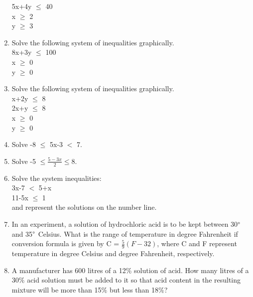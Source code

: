 \begin{enumerate}[label=\arabic*.,ref=\thesubsection.\theenumi]
     5x+4y $\leq$ 40\\
     x $\geq$ 2\\
     y $\geq$ 3\\
     \item Solve the following system of inequalities graphically.\\
     8x+3y $\leq$ 100\\
     x $\geq$ 0\\
     y $\geq$ 0\\
     \item Solve the following system of inequalities graphically.\\
     x+2y $\leq$ 8\\
     2x+y $\leq$ 8\\
     x $\geq$ 0\\
     y $\geq$ 0\\
     \item Solve -8 $\leq$ 5x-3 $<$ 7.\\
     \item Solve -5 $\leq \frac{5-3x}{2} \leq 8$.\\
     \item Solve the system inequalities:\\
     3x-7 $<$ 5+x\\
     11-5x $\leq$ 1\\
     and represent the solutions on the number line.\\
     \item In an experiment, a solution of hydrochloric acid is to be kept between 30$\degree$ and 35$\degree$ Celsius. What is the range of temperature in degree Fahrenheit if conversion formula is given by 
     C = $\frac{5}{9}(F-32)$, where C and F represent temperature in degree Celsius and degree Fahrenheit, respectively.\\
     \item A manufacturer has 600 litres of a 12$\%$ solution of acid. How many litres of a 30$\%$ acid solution must be added to it so that acid content in the resulting mixture will be more than 15$\%$ but less than 18$\%$?\\
    
    
 \end{enumerate}
    
